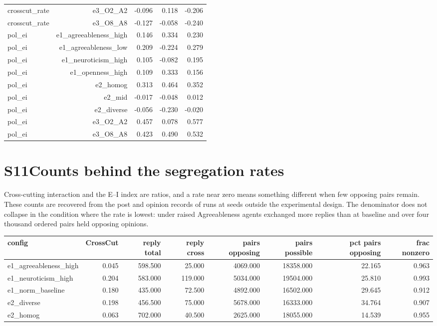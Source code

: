 \documentclass[11pt]{article}
\begin{document}
\begin{longtable}{@{}lrrrr@{}}
crosscut\_rate & e3\_O2\_A2 & -0.096 & 0.118 & -0.206 \\
crosscut\_rate & e3\_O8\_A8 & -0.127 & -0.058 & -0.240 \\
pol\_ei & e1\_agreeableness\_high & 0.146 & 0.334 & 0.230 \\
pol\_ei & e1\_agreeableness\_low & 0.209 & -0.224 & 0.279 \\
pol\_ei & e1\_neuroticism\_high & 0.105 & -0.082 & 0.195 \\
pol\_ei & e1\_openness\_high & 0.109 & 0.333 & 0.156 \\
pol\_ei & e2\_homog & 0.313 & 0.464 & 0.352 \\
pol\_ei & e2\_mid & -0.017 & -0.048 & 0.012 \\
pol\_ei & e2\_diverse & -0.056 & -0.230 & -0.020 \\
pol\_ei & e3\_O2\_A2 & 0.457 & 0.078 & 0.577 \\
pol\_ei & e3\_O8\_A8 & 0.423 & 0.490 & 0.532 \\
\bottomrule
\end{longtable}
\normalsize

\medskip

\section*{S11\quad Counts behind the segregation rates}
Cross-cutting interaction and the E--I index are ratios, and a rate near zero means something different when few opposing pairs remain. These counts are recovered from the post and opinion records of runs at seeds outside the experimental design. The denominator does not collapse in the condition where the rate is lowest: under raised Agreeableness agents exchanged more replies than at baseline and over four thousand ordered pairs held opposing opinions.
\scriptsize
\setlength{\tabcolsep}{2.5pt}
\begin{longtable}{@{}lrrrrrrr@{}}
\toprule
config & CrossCut & reply total & reply cross & pairs opposing & pairs possible & pct pairs opposing & frac nonzero \\
\midrule
\endhead
e1\_agreeableness\_high & 0.045 & 598.500 & 25.000 & 4069.000 & 18358.000 & 22.165 & 0.963 \\
e1\_neuroticism\_high & 0.204 & 583.000 & 119.000 & 5034.000 & 19504.000 & 25.810 & 0.993 \\
e1\_norm\_baseline & 0.180 & 435.000 & 72.500 & 4892.000 & 16502.000 & 29.645 & 0.912 \\
e2\_diverse & 0.198 & 456.500 & 75.000 & 5678.000 & 16333.000 & 34.764 & 0.907 \\
e2\_homog & 0.063 & 702.000 & 40.500 & 2625.000 & 18055.000 & 14.539 & 0.955 \\
\bottomrule
\end{longtable}
\normalsize
\end{document}

